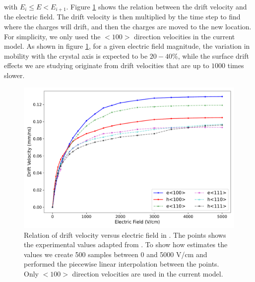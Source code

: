 \noindent
with $E_i \le E < E_{i+1}$. Figure \ref{ch3_fig_dv_vs_e} shows the relation between the drift velocity and the electric field. The drift velocity is then multiplied by the time step to find where the charges will drift, and then the charges are moved to the new location. For simplicity, we only used the $<100>$ direction velocities in the current model. As shown in figure \ref{ch3_fig_dv_vs_e}, for a given electric field magnitude, the variation in mobility with the crystal axis is expected to be $20-40\%$, while the surface drift effects we are studying originate from drift velocities that are up to $1000$ times slower.

\begin{figure}[!htb]
    \includegraphics[trim={0cm 0 0cm 0},clip,width=0.99\linewidth]{ch3/figs/ehd_dv_e.pdf}
    \caption{Relation of drift velocity versus electric field in {\ehd}. The points shows the experimental values adapted from \cite{OMAR19871351}. To show how {\ehd} estimates the values we create 500 samples between 0 and 5000 V/cm and performed the piecewise linear interpolation between the points. Only $<100>$ direction velocities are used in the current model.}
    \label{ch3_fig_dv_vs_e}
\end{figure}


